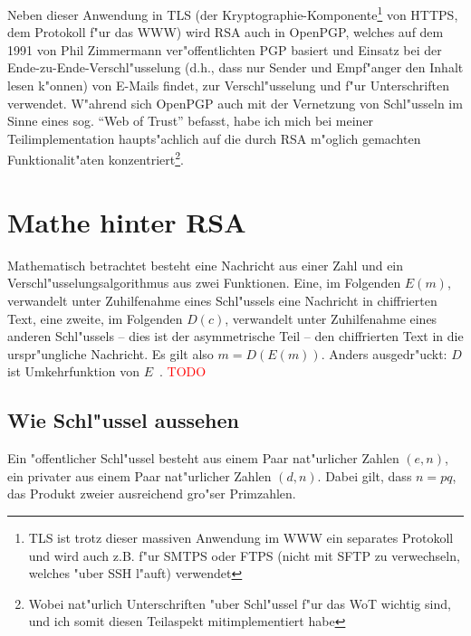 \documentclass[12pt]{article}
\newcommand{\todo}[1]{\textcolor{red}{\mbox{TODO}}\marginpar{\textcolor{red}{#1}}}
\begin{document}
Neben dieser Anwendung in TLS (der Kryptographie-Komponente\footnote{
TLS ist trotz dieser massiven Anwendung im WWW ein separates Protokoll und wird auch z.B. f"ur SMTPS oder FTPS (nicht mit SFTP zu verwechseln, welches "uber SSH l"auft) verwendet}
von HTTPS, dem Protokoll f"ur das WWW) wird RSA auch in OpenPGP,
welches auf dem 1991 von Phil Zimmermann ver"offentlichten PGP basiert und Einsatz bei der Ende-zu-Ende-Verschl"usselung
(d.h., dass nur Sender und Empf"anger den Inhalt lesen k"on\-nen)
von E-Mails findet, zur Verschl"usselung und f"ur Unterschriften verwendet.
W"ah\-rend sich OpenPGP auch mit der Vernetzung von Schl"usseln im Sinne eines sog. "`Web of Trust"' befasst,
habe ich mich bei meiner Teilimplementation haupts"achlich auf die durch RSA m"oglich gemachten
Funktionalit"aten konzentriert\footnote{Wobei nat"urlich Unterschriften "uber Schl"ussel f"ur das WoT wichtig sind, und ich somit diesen Teilaspekt mitimplementiert habe}.

\section{Mathe hinter RSA}

Mathematisch betrachtet besteht eine Nachricht aus einer Zahl und ein
Verschl"usselungsalgorithmus aus zwei Funktionen.
Eine, im Folgenden $E(m)$, verwandelt unter Zuhilfenahme eines Schl"ussels eine
Nachricht in chiffrierten Text, eine zweite, im Folgenden $D(c)$,
verwandelt unter Zuhilfenahme eines anderen Schl"ussels -- dies ist der asymmetrische Teil --
den chiffrierten Text in die urspr"ungliche Nachricht.
Es gilt also $m = D(E(m))$.
Anders ausgedr"uckt: $D$ ist Umkehrfunktion von $E$~\cite{rsa}.
\todo{Hier irgendwo auch Unterschriften erw"ahnen?}

\subsection{Wie Schl"ussel aussehen}
\label{subsec:rsa:keys}

Ein "offentlicher Schl"ussel besteht aus einem Paar nat"urlicher Zahlen $(e, n)$,
ein privater aus einem Paar nat"urlicher Zahlen $(d, n)$.
Dabei gilt, dass $n = pq$, das Produkt zweier ausreichend gro"ser Primzahlen.~\cite{rsa}
\end{document}
